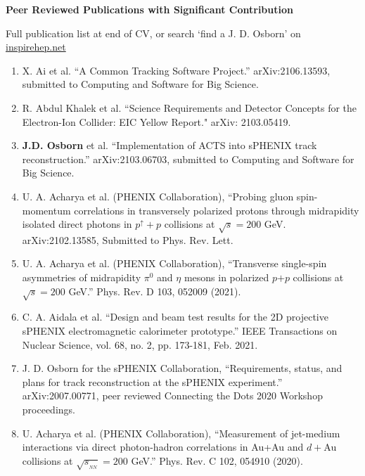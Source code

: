 \documentclass[11pt]{article}
\begin{document}
\begin{flushleft}
\LARGE\textbf{Peer Reviewed Publications with Significant Contribution}
\vspace{4pt}

\small 
Full publication list at end of CV, or search `find a J. D. Osborn' on \href{inspirehep.net}{inspirehep.net} 
\begin{center}
\normalsize
\begin{enumerate}
	\item X. Ai et al. ``A Common Tracking Software Project.'' arXiv:2106.13593, submitted to Computing and Software for Big Science.
	\item R. Abdul Khalek et al. ``Science Requirements and Detector Concepts for the Electron-Ion Collider: EIC Yellow Report." arXiv: 2103.05419. 
	
	\item {\textbf{J.D. Osborn}} et al. ``Implementation of ACTS into sPHENIX track reconstruction.'' arXiv:2103.06703, 
	submitted to Computing and Software for Big Science.
	\item U. A. Acharya et al. (PHENIX Collaboration), ``Probing gluon spin-momentum correlations in transversely polarized protons through midrapidity isolated direct photons in $p^\uparrow+p$ collisions at $\sqrt{s}=200$ GeV. arXiv:2102.13585, Submitted to Phys. Rev. Lett.
	
	\item U. A. Acharya et al. (PHENIX Collaboration), ``Transverse single-spin asymmetries of midrapidity $\pi^0$ and $\eta$ mesons in polarized $p$$+$$p$ collisions at $\sqrt{s}=200$ GeV.'' Phys. Rev. D 103, 052009 (2021).
	
	\item C. A. Aidala et al. ``Design and beam test results for the 2D projective sPHENIX electromagnetic calorimeter prototype.'' IEEE Transactions on Nuclear Science, vol. 68, no. 2, pp. 173-181, Feb. 2021.
	
	\item J. D. Osborn for the sPHENIX Collaboration, ``Requirements, status, and plans for track reconstruction at the sPHENIX experiment.'' arXiv:2007.00771, peer reviewed Connecting the Dots 2020 Workshop proceedings.
	
	\item U. Acharya et al. (PHENIX Collaboration), ``Measurement of jet-medium interactions via direct photon-hadron correlations in Au+Au and $d+$Au collisions at $\sqrt{s_{_{NN}}}=200$ GeV.'' Phys. Rev. C 102, 054910 (2020).
	

\end{enumerate}
\end{center}
\end{flushleft}
\end{document}
